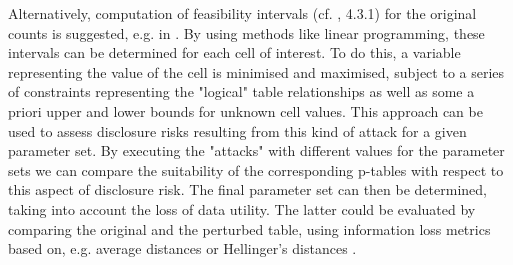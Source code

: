 Alternatively, computation of feasibility intervals (cf. \cite{sdc_wiley} , 4.3.1) for the original counts is suggested, e.g. in \cite{ckm_enderle_psd2018}.
By using methods like linear programming, these intervals can be determined for each cell of interest. To do this, a variable representing the value of the cell is minimised and maximised, subject to a series of constraints representing the "logical" table relationships as well as some a priori upper and lower bounds for unknown cell values.
This approach can be used to assess disclosure risks resulting from this kind of attack for a given parameter set. By executing the "attacks" with different values for the parameter sets we can compare the suitability of the corresponding p-tables with respect to this aspect of disclosure risk. 
The final parameter set can then be determined, taking into account the loss of data utility. The latter could be evaluated by comparing the original and the perturbed table, using information loss metrics based on, e.g. average distances or Hellinger's distances \cite[ch. 4.7.2 and 5.8]{HundepoolEtAl2024}.

